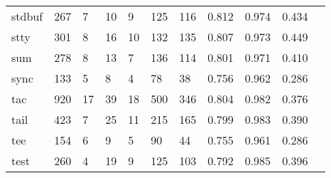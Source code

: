 \begin{longtable}{lp{1.10cm}p{1.10cm}p{1.10cm}p{1.10cm}p{1.10cm}p{1.10cm}p{1.10cm}p{1.10cm}p{1.10cm}p{1.10cm}}
stdbuf    &                    267 &                                  7 &                                10 &                                9 &                               125 &                             116 &                             0.812 &                                 0.974 &                               0.434 \\
stty      &                    301 &                                  8 &                                16 &                               10 &                               132 &                             135 &                             0.807 &                                 0.973 &                               0.449 \\
sum       &                    278 &                                  8 &                                13 &                                7 &                               136 &                             114 &                             0.801 &                                 0.971 &                               0.410 \\
sync      &                    133 &                                  5 &                                 8 &                                4 &                                78 &                              38 &                             0.756 &                                 0.962 &                               0.286 \\
tac       &                    920 &                                 17 &                                39 &                               18 &                               500 &                             346 &                             0.804 &                                 0.982 &                               0.376 \\
tail      &                    423 &                                  7 &                                25 &                               11 &                               215 &                             165 &                             0.799 &                                 0.983 &                               0.390 \\
tee       &                    154 &                                  6 &                                 9 &                                5 &                                90 &                              44 &                             0.755 &                                 0.961 &                               0.286 \\
test      &                    260 &                                  4 &                                19 &                                9 &                               125 &                             103 &                             0.792 &                                 0.985 &                               0.396 \\

\end{longtable}
